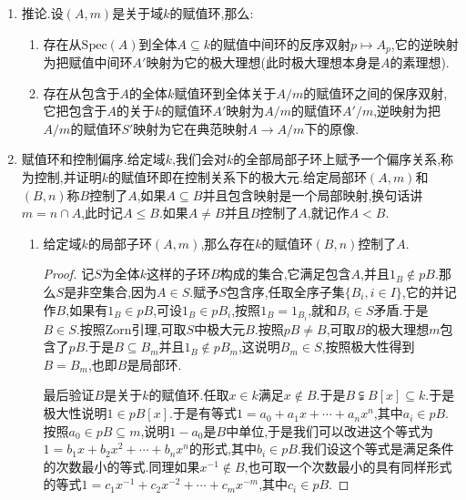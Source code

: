 \begin{enumerate}
\begin{proof}
    	第四条.按照$m'\subseteq S$和$S/m'=S'$.如果$x\in R'$,$x\not\in S$,那么$\varphi(x)$不在$S'$中,于是$\varphi(x^{-1})\in S'$,于是$x^{-1}\in S$.再设如果$x\in k-R'$,那么$x^{-1}\in m'\subseteq S$.
    \end{proof}
    \item 推论.设$(A,m)$是关于域$k$的赋值环,那么:
    \begin{enumerate}[(1)]
    	\item 存在从$\mathrm{Spec}(A)$到全体$A\subseteq k$的赋值中间环的反序双射$p\mapsto A_p$,它的逆映射为把赋值中间环$A'$映射为它的极大理想(此时极大理想本身是$A$的素理想).
    	\item 存在从包含于$A$的全体$k$赋值环到全体关于$A/m$的赋值环之间的保序双射,它把包含于$A$的关于$k$的赋值环$A'$映射为$A/m$的赋值环$A'/m$,逆映射为把$A/m$的赋值环$S'$映射为它在典范映射$A\to A/m$下的原像.
    \end{enumerate}
    \item 赋值环和控制偏序.给定域$k$,我们会对$k$的全部局部子环上赋予一个偏序关系,称为控制,并证明$k$的赋值环即在控制关系下的极大元.给定局部环$(A,m)$和$(B,n)$称$B$控制了$A$,如果$A\subseteq B$并且包含映射是一个局部映射,换句话讲$m=n\cap A$,此时记$A\le B$.如果$A\not=B$并且$B$控制了$A$,就记作$A<B$.
    \begin{enumerate}[(1)]
    	\item 给定域$k$的局部子环$(A,m)$,那么存在$k$的赋值环$(B,n)$控制了$A$.
    	\begin{proof}
    		
    		记$S$为全体$k$这样的子环$B$构成的集合,它满足包含$A$,并且$1_B\not\in pB$.那么$S$是非空集合,因为$A\in S$.赋予$S$包含序,任取全序子集$\{B_i,i\in I\}$,它的并记作$B$,如果有$1_B\in pB$,可设$1_B\in pB_i$,按照$1_B=1_{B_i}$,就和$B_i\in S$矛盾.于是$B\in S$.按照Zorn引理,可取$S$中极大元$B$.按照$pB\not=B$,可取$B$的极大理想$m$包含了$pB$.于是$B\subseteq B_m$并且$1_B\not\in pB_m$,这说明$B_m\in S$,按照极大性得到$B=B_m$,也即$B$是局部环.
    		
    		最后验证$B$是关于$k$的赋值环.任取$x\in k$满足$x\not\in B$.于是$B\subsetneqq B[x]\subseteq k$.于是极大性说明$1\in pB[x]$.于是有等式$1=a_0+a_1x+\cdots+a_nx^n$,其中$a_i\in pB$.按照$a_0\in pB\subseteq m$,说明$1-a_0$是$B$中单位,于是我们可以改进这个等式为$1=b_1x+b_2x^2+\cdots+b_nx^n$的形式,其中$b_i\in pB$.我们设这个等式是满足条件的次数最小的等式.同理如果$x^{-1}\not\in B$,也可取一个次数最小的具有同样形式的等式$1=c_1x^{-1}+c_2x^{-2}+\cdots+c_mx^{-m}$,其中$c_i\in pB$.
    		

\end{proof}
\end{enumerate}
\end{enumerate}
